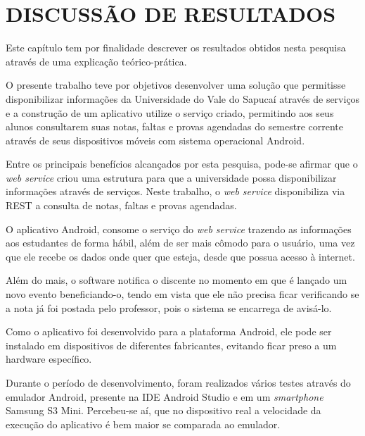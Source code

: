 
\chapter{DISCUSSÃO DE RESULTADOS} 

	\par Este capítulo tem por finalidade descrever os resultados obtidos nesta
pesquisa através de uma explicação teórico-prática.

	\par O presente trabalho teve por objetivos desenvolver uma solução que
permitisse disponibilizar informações da Universidade do Vale do Sapucaí
através de serviços e a construção de um aplicativo utilize o serviço criado,
permitindo aos seus alunos consultarem suas notas, faltas e provas agendadas do
semestre corrente através de seus dispositivos móveis com sistema operacional
Android.

	\par Entre os principais benefícios alcançados por esta pesquisa, pode-se
afirmar que o \textit{web service} criou uma estrutura para que a universidade
possa disponibilizar informações através de serviços. Neste trabalho, o
\textit{web service} disponibiliza via REST a consulta de notas, faltas e
provas agendadas.

	\par O aplicativo Android, consome o serviço do \textit{web service} trazendo
as informações aos estudantes de forma hábil, além de ser mais cômodo para o
usuário, uma vez que ele recebe os dados onde quer que esteja, desde que possua
acesso à internet.

	\par Além do mais, o software notifica o discente no momento em que é lançado
um novo evento beneficiando-o, tendo em vista que ele não precisa ficar
verificando se a nota já foi postada pelo professor, pois o sistema se
encarrega de avisá-lo.

	\par Como o aplicativo foi desenvolvido para a plataforma Android, ele pode ser
instalado em dispositivos de diferentes fabricantes, evitando ficar preso a um
hardware específico.

	\par Durante o período de desenvolvimento, foram realizados vários testes
através do emulador Android, presente na IDE Android Studio e em um
\textit{smartphone} Samsung S{3} Mini. Percebeu-se aí, que no dispositivo real a
velocidade da execução do aplicativo é bem maior se comparada ao emulador.

